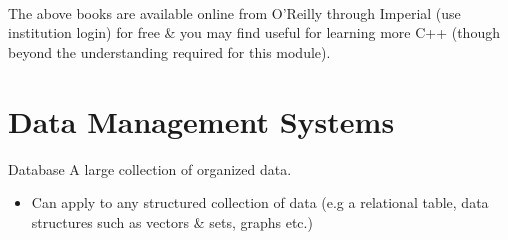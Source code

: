 \\ 
\\ \vspace{5mm}
\\ The above books are available online from O'Reilly through Imperial (use institution login) for free \& you may find useful for learning more C++ (though beyond the understanding required for this module).

\section{Data Management Systems}
\begin{definitionbox}{Database}
    A large collection of organized data.
    \begin{itemize}
        \item Can apply to any structured collection of data (e.g a relational table, data structures such as vectors \& sets, graphs etc.)
    \end{itemize}
\end{definitionbox}

